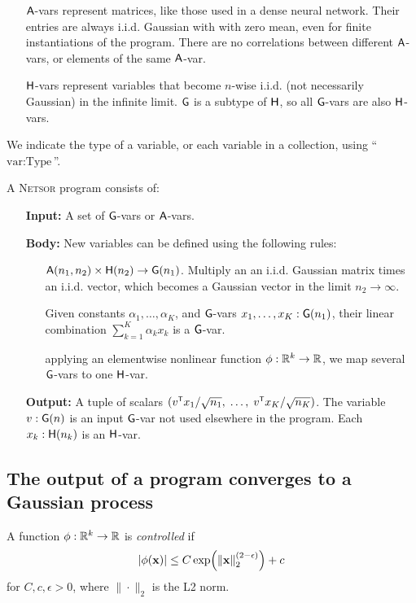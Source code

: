 {\begin{itemize}
\item[$\mathsf{A}$-vars] represent matrices,
like those used in a dense neural network. Their entries are always i.i.d.
Gaussian with with zero mean, even for finite instantiations of the program.
There are no correlations between different $\mathsf{A}$-vars, or elements of the same $\mathsf{A}$-var.

\item[$\mathsf{H}$-vars] represent variables that become $n$-wise i.i.d. (not necessarily
Gaussian) in the
infinite limit. $\mathsf{G}$ is a subtype of $\mathsf{H}$, so all $\mathsf{G}$-vars are also $\mathsf{H}$-vars.
\end{itemize}

We indicate the type of a variable, or each variable in a
collection, using ``$\text{var} : \text{Type}$''.


\begin{definition}
A \textsc{Netsor} program consists of:
\begin{itemize}
  \item[\bf Input:]
 A set of $\mathsf{G}$-vars or $\mathsf{A}$-vars.

 \item[\bf Body:]
New variables can be defined using the following rules:
\begin{enumerate}
  \item[\MatMul] $\mathsf{A}(n_1, n_2) \times \mathsf{H}(n_2) \to \mathsf{G}(n_1)$. Multiply an
    an i.i.d. Gaussian matrix times an i.i.d. vector, which becomes a Gaussian
    vector in the limit $n_2 \to \infty$.
  \item[\LinComb] Given constants $\alpha_1,\dots,\alpha_K$, and $\mathsf{G}$-vars
    $x_1,\dots,x_K : \mathsf{G}(n_1)$, their linear combination $\sum_{k=1}^K \alpha_k
    x_k$ is a $\mathsf{G}$-var.
  \item[\Nonlin] applying an elementwise nonlinear function $\phi : \mathbb{R}^k \to
    \mathbb{R}$, we map
    several $\mathsf{G}$-vars to one $\mathsf{H}$-var. 
\end{enumerate}

\item[\bf Output:]
A tuple of scalars $(v^\tp x_1/\sqrt{n_1}, \;\dots, \; v^\tp
x_K/\sqrt{n_K})$. The variable $v : \mathsf{G}(n)$ is an input $\mathsf{G}$-var not used
elsewhere in the program. Each $x_k : \mathsf{H}(n_k)$ is an $\mathsf{H}$-var.
\end{itemize}
\end{definition}

\subsection{The output of a \Netsor program converges to a Gaussian process}
\begin{definition}
  A function $\phi: \mathbb{R}^k \to \mathbb{R}$ is \emph{controlled} if
  \[ \abs{\phi(\vx)} \le C\, \text{exp} \bra{\bracket{\|}{\|}{\vx}_2^\bra{2-\epsilon}}
    + c \]
  for 
  $C,c,\epsilon > 0$, where $\|\cdot\|_2$ is the L2 norm.\end{definition}

}
